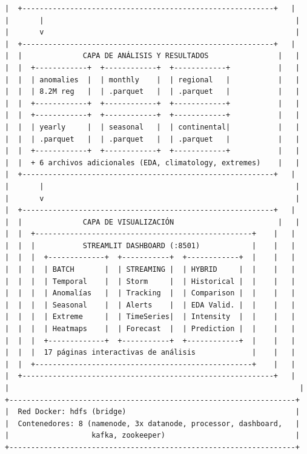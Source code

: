 \documentclass[12pt,a4paper]{scrartcl}
\begin{document}
\begin{verbatim}
|  +----------------------------------------------------------+   |
|       |                                                          |
|       v                                                          |
|  +----------------------------------------------------------+   |
|  |              CAPA DE ANÁLISIS Y RESULTADOS                |   |
|  |  +------------+  +------------+  +------------+           |   |
|  |  | anomalies  |  | monthly    |  | regional   |           |   |
|  |  | 8.2M reg   |  | .parquet   |  | .parquet   |           |   |
|  |  +------------+  +------------+  +------------+           |   |
|  |  +------------+  +------------+  +------------+           |   |
|  |  | yearly     |  | seasonal   |  | continental|           |   |
|  |  | .parquet   |  | .parquet   |  | .parquet   |           |   |
|  |  +------------+  +------------+  +------------+           |   |
|  |  + 6 archivos adicionales (EDA, climatology, extremes)    |   |
|  +----------------------------------------------------------+   |
|       |                                                          |
|       v                                                          |
|  +----------------------------------------------------------+   |
|  |              CAPA DE VISUALIZACIÓN                        |   |
|  |  +--------------------------------------------------+    |   |
|  |  |           STREAMLIT DASHBOARD (:8501)            |    |   |
|  |  |  +-------------+  +-----------+  +------------+  |    |   |
|  |  |  | BATCH       |  | STREAMING |  | HYBRID     |  |    |   |
|  |  |  | Temporal    |  | Storm     |  | Historical |  |    |   |
|  |  |  | Anomalías   |  | Tracking  |  | Comparison |  |    |   |
|  |  |  | Seasonal    |  | Alerts    |  | EDA Valid. |  |    |   |
|  |  |  | Extreme     |  | TimeSeries|  | Intensity  |  |    |   |
|  |  |  | Heatmaps    |  | Forecast  |  | Prediction |  |    |   |
|  |  |  +-------------+  +-----------+  +------------+  |    |   |
|  |  |  17 páginas interactivas de análisis             |    |   |
|  |  +--------------------------------------------------+    |   |
|  +----------------------------------------------------------+   |
|                                                                   |
+------------------------------------------------------------------+
|  Red Docker: hdfs (bridge)                                       |
|  Contenedores: 8 (namenode, 3x datanode, processor, dashboard,   |
|                   kafka, zookeeper)                              |
+------------------------------------------------------------------+
\end{verbatim}
\end{document}
